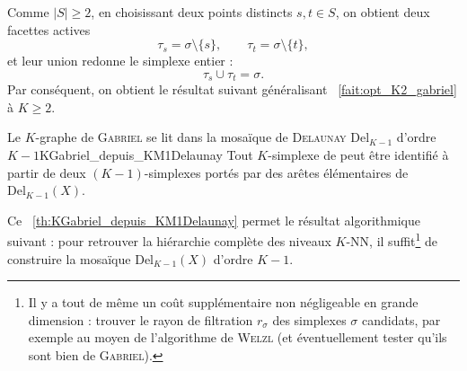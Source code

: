 
Comme \(|S|\geq 2\), en choisissant deux points distincts \(s,t\in S\),
on obtient deux facettes actives
\[
        \tau_s = \sigma\setminus\{s\},
        \qquad
        \tau_t = \sigma\setminus\{t\},
\]
et leur union redonne le simplexe entier :
\[
        \tau_s \cup \tau_t = \sigma .
\]
Par conséquent, on obtient le résultat suivant généralisant \Fact~\ref{fait:opt_K2_gabriel} à $K\ge 2$.
\begin{Theoreme}{Le $K$-graphe de \textsc{Gabriel} se lit dans la mosaïque de \textsc{Delaunay} \(\mathrm{Del}_{K-1}\) d'ordre $K-1$}{KGabriel_depuis_KM1Delaunay}
Tout \(K\)-simplexe de  peut être identifié à partir de deux \((K-1)\)-simplexes portés par des arêtes élémentaires de \(\mathrm{Del}_{K-1}(X)\).
\end{Theoreme}


Ce \Th~\ref{th:KGabriel_depuis_KM1Delaunay} permet le résultat algorithmique suivant : pour retrouver la hiérarchie complète des niveaux $K$-NN, il suffit\footnote{Il y a tout de même un coût supplémentaire non négligeable en grande dimension : trouver le rayon de filtration $r_\sigma$ des simplexes $\sigma$ candidats, par exemple au moyen de l'algorithme de \textsc{Welzl} \cite{Welzl1991} (et éventuellement tester qu'ils sont bien de \textsc{Gabriel}).} de construire la mosaïque \(\mathrm{Del}_{K-1}(X)\) d'ordre $K-1$.




